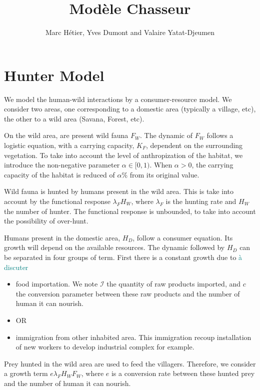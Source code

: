 \documentclass{article}
\title{Modèle Chasseur}
\author{Marc Hétier, Yves Dumont  and Valaire Yatat-Djeumen}
\newcommand{\lfw}{\lambda_{F}}
\newcommand{\lfw}{\lambda_{F}}
\newcommand{\marc}[1]{\textcolor{teal}{#1}}
\begin{document}
\maketitle


\section{Hunter Model}

We model the human-wild interactions by a consumer-resource model. We consider two areas, one corresponding to a domestic area (typically a village, etc), the other to a wild area (Savana, Forest, etc).


On the wild area, are present wild fauna $F_W$. The dynamic of $F_W$ follows a logistic equation, with a carrying capacity, $K_F$, dependent on the surrounding vegetation. To take into account the level of anthropization of the habitat, we introduce the non-negative parameter $\alpha \in [0, 1)$. When $\alpha > 0$, the carrying capacity of the habitat is reduced of $\alpha \%$ from its original value.

Wild fauna is hunted by humans present in the wild area. This is take into account by the functional response $\lfw H_W$, where $\lfw$ is the hunting rate and $H_W$ the number of hunter. The functional response is unbounded, to take into account the possibility of over-hunt.

Humans present in the domestic area, $H_D$, follow a consumer equation. Its growth will depend on the available resources. The dynamic followed by $H_D$ can be separated in four groups of term. 
First there is a constant growth due to \marc{à discuter}
\begin{itemize}
 \item food importation. We note $\mathcal{I}$ the quantity of raw products imported, and $c$ the conversion parameter between these raw products and the number of human it can nourish.  
 \item OR
 \item immigration from other inhabited area. This immigration recoup installation of new workers to develop industrial complex for example.
 \end{itemize} 

Prey hunted in the wild area are used to feed the villagers. Therefore, we consider a growth term $e \lfw H_W F_W$, where $e$ is a conversion rate between these hunted prey and the number of human it can nourish.
\end{document}
